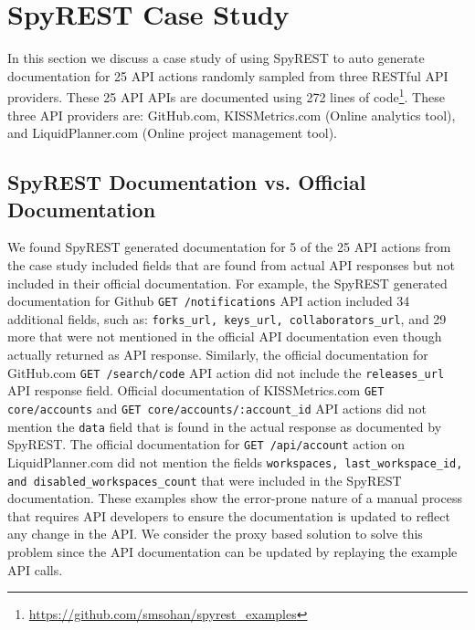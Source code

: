 \section{SpyREST Case Study}
\label{sec:case_study}
In this section we discuss a case study of using SpyREST to auto generate documentation for 25 API actions randomly sampled from three RESTful API providers. These 25 API APIs are documented using 272 lines of code\footnote{\url{https://github.com/smsohan/spyrest_examples}}. These three API providers are: GitHub.com, KISSMetrics.com (Online analytics tool), and LiquidPlanner.com (Online project management tool).

\subsection{SpyREST Documentation vs. Official Documentation} %
\label{sub:spyrest_vs_official_documentation}

We found SpyREST generated documentation for 5 of the 25 API actions from the case study included fields that are found from actual API responses but not included in their official documentation. For example, the SpyREST generated documentation for Github \texttt{GET /notifications} API action included 34 additional fields, such as: \texttt{forks\_url, keys\_url, collaborators\_url}, and 29 more that were not mentioned in the official API documentation even though actually returned as API response. Similarly, the official documentation for GitHub.com \texttt{GET /search/code} API action did not include the \texttt{releases\_url} API response field. Official documentation of KISSMetrics.com \texttt{GET core/accounts} and \texttt{GET core/accounts/:account\_id} API actions did not mention the \texttt{data} field that is found in the actual response as documented by SpyREST. The official documentation for \texttt{GET /api/account} action on LiquidPlanner.com did not mention the fields \texttt{workspaces, last\_workspace\_id, and disabled\_workspaces\_count} that were included in the SpyREST documentation. These examples show the error-prone nature of a manual process that requires API developers to ensure the documentation is updated to reflect any change in the API. We consider the proxy based solution to solve this problem since the API documentation can be updated by replaying the example API calls.

